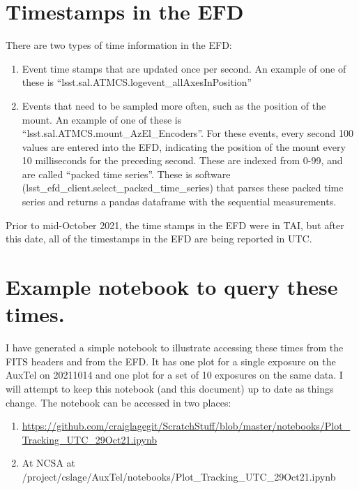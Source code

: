\documentclass[SE,authoryear,toc]{lsstdoc}
\begin{document}
\section{Timestamps in the EFD}

There are two types of time information in the EFD:
\begin{enumerate}
  \item Event time stamps that are updated once per second.  An example of one of these is ``lsst.sal.ATMCS.logevent\_allAxesInPosition''
  \item Events that need to be sampled more often, such as the position of the mount.  An example of one of these is ``lsst.sal.ATMCS.mount\_AzEl\_Encoders''.  For these events, every second 100 values are entered into the EFD, indicating the position of the mount every 10 milliseconds for the preceding second.  These are indexed from 0-99, and are called ``packed time series''.  These is software (lsst\_efd\_client.select\_packed\_time\_series) that parses these packed time series and returns a pandas dataframe with the sequential measurements.
\end{enumerate}
Prior to mid-October 2021, the time stamps in the EFD were in TAI, but after this date, all of the timestamps in the EFD are being reported in UTC.
\section{Example notebook to query these times.}

I have generated a simple notebook to illustrate accessing these times from the FITS headers and from the EFD.  It has one plot for a single exposure on the AuxTel on 20211014 and one plot for a set of 10 exposures on the same data.  I will attempt to keep this notebook (and this document) up to date as things change.  The notebook can be accessed in two places:
\begin{enumerate}
  \item \url{https://github.com/craiglagegit/ScratchStuff/blob/master/notebooks/Plot_Tracking_UTC_29Oct21.ipynb}
  \item At NCSA at /project/cslage/AuxTel/notebooks/Plot\_Tracking\_UTC\_29Oct21.ipynb
\end{enumerate}
\end{document}
